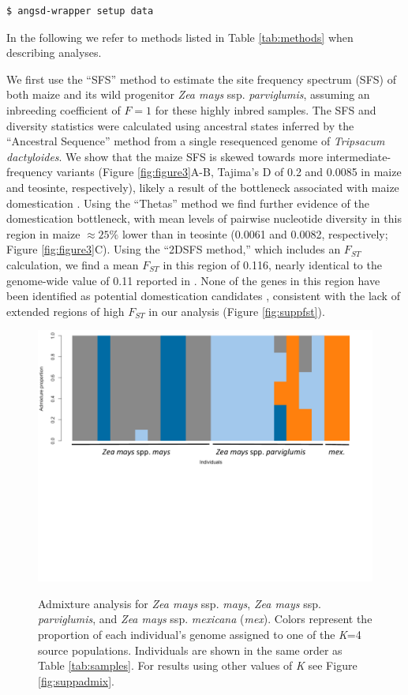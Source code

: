 \documentclass[10pt,a4paper]{article}
\newcommand{\fst}{${F_{ST}}$ }
\begin{document}
\begin{lstlisting}
$ angsd-wrapper setup data
\end{lstlisting}

In the following we refer to methods listed in Table \ref{tab:methods} when describing analyses.

We first use the ``SFS'' method to estimate the site frequency spectrum (SFS) of both maize and its wild progenitor \textit{Zea mays} ssp. \textit{parviglumis}, assuming an inbreeding coefficient of $F=1$ for these highly inbred samples. 
The SFS and diversity statistics were calculated using ancestral states inferred by the ``Ancestral Sequence'' method from a single resequenced genome of \textit{Tripsacum dactyloides}.  
We show that the maize SFS is skewed towards more intermediate-frequency variants (Figure \ref{fig:figure3}A-B, Tajima's D of 0.2 and 0.0085 in maize and teosinte, respectively), likely a result of the bottleneck associated with maize domestication \citep{eyre1998investigation, Beissinger031666}.
Using the ``Thetas'' method we find further evidence of the domestication bottleneck, with mean levels of pairwise nucleotide diversity in this region in maize $\approx 25\%$ lower than in teosinte (0.0061 and 0.0082, respectively; Figure \ref{fig:figure3}C). 
Using the ``2DSFS method,'' which includes an \fst calculation, we find a mean \fst in this region of 0.116, nearly identical to the  genome-wide value of 0.11 reported in \cite{hufford2012comparative}.   
None of the genes in this region have been identified as potential domestication candidates \cite{hufford2012comparative}, consistent with the lack of extended regions of high \fst in our analysis (Figure \ref{fig:suppfst}).

\begin{figure}
\centering
\caption{Admixture analysis for {\it Zea mays} ssp. {\it mays}, {\it Zea mays} ssp. {\it parviglumis}, and {\it Zea mays} ssp. {\it mexicana} (\textit{mex}). Colors represent the proportion of each individual's genome assigned to one of the {\it K}=4 source populations. 
Individuals are shown in the same order as Table \ref{tab:samples}. For results using other values of \textit{K} see Figure \ref{fig:suppadmix}.}
\includegraphics[width=0.8\linewidth]{figures/mt4labeled.pdf}
\label{fig:admixture}
\end{figure}
\end{document}
